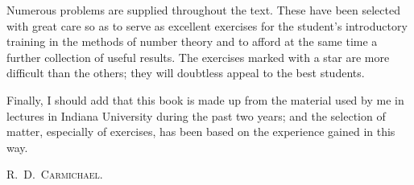 \documentclass[oneside]{book}
\begin{document}
Numerous problems are supplied throughout the text. These have been
selected with great care so as to serve as excellent exercises for
the student's introductory training in the methods of number theory
and to afford at the same time a further collection of useful
results. The exercises marked with a star are more difficult than
the others; they will doubtless appeal to the best students.

Finally, I should add that this book is made up from the material
used by me in lectures in Indiana University during the past two
years; and the selection of matter, especially of exercises, has
been based on the experience gained in this way.

\hfill \textsc{R.~D.\ Carmichael.}

\tableofcontents

\end{document}
